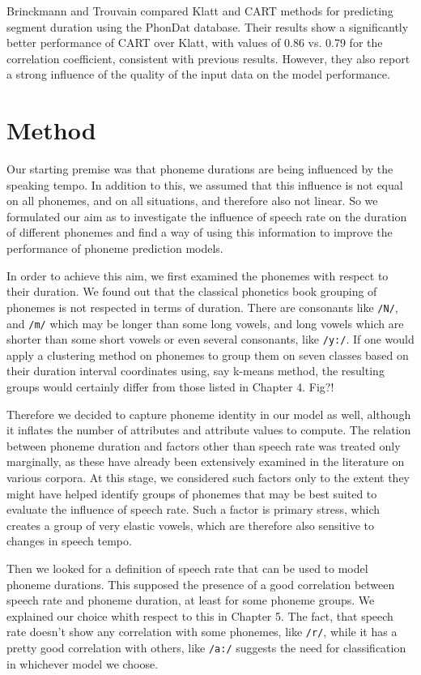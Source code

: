 \documentclass[a4paper]{scrreprt}
\begin{document}
Brinckmann and Trouvain \cite{Brinckmann_2003} compared Klatt and CART methods for predicting segment duration using the PhonDat database. Their results show a significantly better performance of CART over Klatt, with values of 0.86 vs. 0.79 for the correlation coefficient, consistent with previous results. However, they also report a strong influence of  the quality of the input data on the model performance.

\section{Method}
Our starting premise was that phoneme durations are being influenced by the speaking tempo. In addition to this, we assumed that this influence is not equal on all phonemes, and on all situations, and therefore also not linear. So we formulated our aim as to investigate the influence of speech rate on the duration of different phonemes and find a way of using this information to improve the performance of phoneme prediction models. 

In order to achieve this aim, we first examined the phonemes with respect to their duration. We found out that the classical phonetics book grouping of phonemes is not respected in terms of duration. There are consonants like \texttt{/N/}, and \texttt{/m/} which may be longer than some long vowels, and long vowels which are shorter than some short vowels or even several consonants, like \texttt{/y:/}. If one would apply a clustering method on phonemes to group them on seven classes based on their duration interval coordinates using, say k-means method, the resulting groups would certainly differ from those listed in Chapter 4. Fig?! 

Therefore we decided to capture phoneme identity in our model as well, although it inflates the number of attributes and attribute values to compute. The relation between phoneme duration and factors other than speech rate was treated only marginally, as these have already been extensively examined in the literature on various corpora. At this stage, we considered such factors only to the extent they might have helped identify groups of phonemes that may be best suited to evaluate the influence of speech rate. Such a factor is primary stress, which creates a group of very elastic vowels, which are therefore also sensitive to changes in speech tempo.

Then we looked for a definition of speech rate that can be used to model phoneme durations. This supposed the presence of a good correlation between speech rate and phoneme duration, at least for some phoneme groups. We explained our choice whith respect to this in Chapter 5. 
The fact, that speech rate doesn't show any correlation with some phonemes, like \texttt{/r/}, while it has a pretty good correlation with others, like \texttt{/a:/} suggests the need for classification in whichever model we choose.
\end{document}
